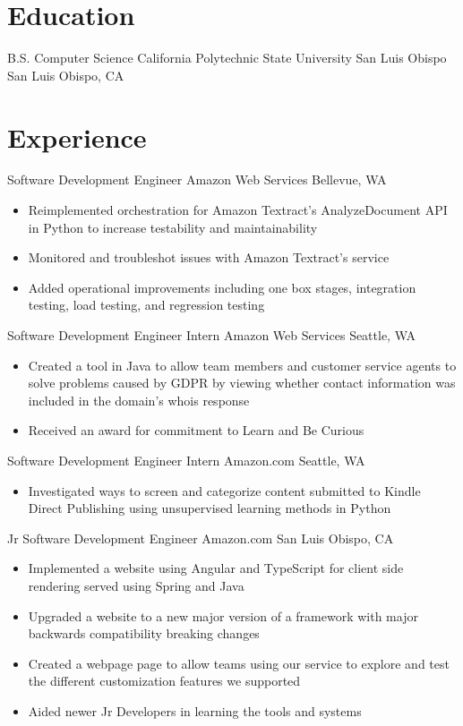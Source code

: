 \documentclass[10pt,a4paper,sans,final]{moderncv}
\begin{document}
\makecvtitle
\section{Education}
    {B.S. Computer Science}
    {California Polytechnic State University San Luis Obispo}
    {San Luis Obispo, CA}
    {}
    {}

\section{Experience}
    {Software Development Engineer}
    {Amazon Web Services}
    {Bellevue, WA}
    {}
    {
        \begin{itemize}
            \item Reimplemented orchestration for Amazon Textract's AnalyzeDocument API in Python to increase testability and maintainability
            \item Monitored and troubleshot issues with Amazon Textract's service
            \item Added operational improvements including one box stages, integration testing, load testing, and regression testing
        \end{itemize}
    }
    {Software Development Engineer Intern}
    {Amazon Web Services}
    {Seattle, WA}
    {}
    {
        \begin{itemize}
            \item Created a tool in Java to allow team members and customer service agents to solve problems caused by GDPR by viewing whether contact information was included in the domain's whois response
            \item Received an award for commitment to Learn and Be Curious
        \end{itemize}
    }
    {Software Development Engineer Intern}
    {Amazon.com}
    {Seattle, WA}
    {}
    {
        \begin{itemize}
            \item Investigated ways to screen and categorize content submitted to Kindle Direct Publishing using unsupervised learning methods in Python
        \end{itemize}
    }
    {Jr Software Development Engineer}
    {Amazon.com}
    {San Luis Obispo, CA}
    {}
    {
        \begin{itemize}
            \item Implemented a website using Angular and TypeScript for client side rendering served using Spring and Java
            \item Upgraded a website to a new major version of a framework with major backwards compatibility breaking changes
            \item Created a webpage page to allow teams using our service to explore and test the different customization features we supported
            \item Aided newer Jr Developers in learning the tools and systems
        \end{itemize}
    }
\end{document}

